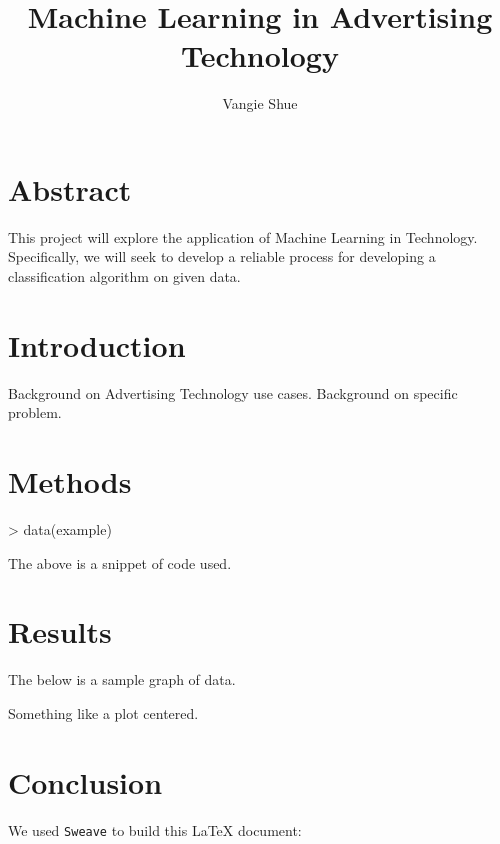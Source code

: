 \documentclass[a4paper]{article}
\title{Machine Learning in Advertising Technology}
\author{Vangie Shue}
\begin{document}


\maketitle
\section*{Abstract}
This project will explore the application of Machine Learning in Technology. Specifically, we will seek to develop a reliable process for developing a classification algorithm on given data.

\section*{Introduction}
Background on Advertising Technology use cases.
Background on specific problem.

\section*{Methods}
\begin{Schunk}
\begin{Sinput}
> data(example)
\end{Sinput}
\end{Schunk}
The above is a snippet of code used. 

\section*{Results}
The below is a sample graph of data.
\begin{center}
Something like a plot centered.
\end{center}

\section*{Conclusion}

We used \texttt{Sweave} to build this \LaTeX{} document:
\end{document}
